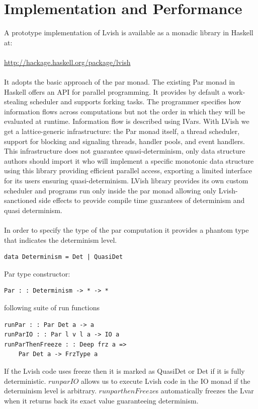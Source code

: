 \documentclass[twocolumn]{article}
\begin{document}
\section{Implementation and Performance}
A prototype implementation of Lvish is available as a monadic library in Haskell at:\\ \\
\url{http://hackage.haskell.org/package/lvish}\\ \\
It adopts the basic approach of the par monad. The existing Par monad\cite{simon} in Haskell offers an API for parallel programming. It provides by default a work-stealing scheduler and supports forking tasks. The programmer specifies how information flows across computations but not the order in which they will be evaluated at runtime. Information flow is described using IVars. With
LVish we get a lattice-generic infrastructure: the Par monad itself, a thread scheduler, support for blocking and signaling threads, handler pools, and event handlers. This infrastructure does not guarantee quasi-determinism, only data structure
authors should import it who will implement a specific monotonic data structure using this library providing efficient parallel access, exporting a limited interface for its users ensuring quasi-determinism. LVish library provides its own custom scheduler and programs run only inside the par monad allowing only Lvish-sanctioned side effects to provide compile time guarantees of
determinism and quasi determinism.\\ \\
In order to specify the type of the par computation it provides a phantom type that indicates the determinism level.
\begin{lstlisting}
data Determinism = Det | QuasiDet
\end{lstlisting}
Par type constructor:
\begin{lstlisting}
Par : : Determinism -> * -> *
\end{lstlisting}
following suite of run functions
\begin{lstlisting}
runPar : : Par Det a -> a
runParIO : : Par l v l a -> IO a
runParThenFreeze : : Deep frz a =>
	Par Det a -> FrzType a
\end{lstlisting}
If the Lvish code uses freeze then it is marked as QuasiDet or Det if it is fully deterministic. $runparIO$ allows us to execute Lvish code in the IO monad if the determinism level is arbitrary. $runparthenFreeze$s automatically freezes the Lvar when it returns back its exact value guaranteeing determinism.\\ \\
\end{document}
